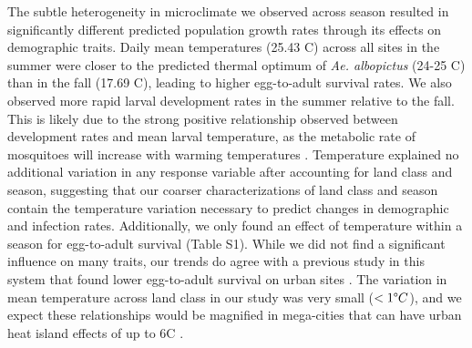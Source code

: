 \documentclass[12pt]{article}
\begin{document}
The subtle heterogeneity in microclimate we observed across season resulted in significantly different predicted population growth rates through its effects on demographic traits.
Daily mean temperatures (25.43 \degree C) across all sites in the summer were closer to the predicted thermal optimum of \textit{Ae. albopictus} (24-25 \degree C) \cite{mordecai2017} than in the fall (17.69 \degree C), leading to higher egg-to-adult survival rates.
We also observed more rapid larval development rates in the summer relative to the fall.
This is likely due to the strong positive relationship observed between development rates and mean larval temperature, as the metabolic rate of mosquitoes will increase with warming temperatures \cite{delatte2009}.
Temperature explained no additional variation in any response variable after accounting for land class and season, suggesting that our coarser characterizations of land class and season contain the temperature variation necessary to predict changes in demographic and infection rates.
Additionally, we only found an effect of temperature within a season for egg-to-adult survival (Table S1).
While we did not find a significant influence on many traits, our trends do agree with a previous study in this system that found lower egg-to-adult survival on urban sites \cite{murdock2017}.
The variation in mean temperature across land class in our study was very small ($<1\degree C$), and we expect these relationships would be magnified in mega-cities that can have urban heat island effects of up to 6\degree C \cite{peng2012}.
\end{document}
